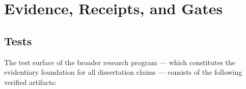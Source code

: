 
\section{Evidence, Receipts, and Gates}
\label{sec:phd-thesis-evidence}

\subsection{Tests}
\label{sec:phd-thesis-evidence-tests}

The test surface of the broader research program --- which constitutes the evidentiary
foundation for all dissertation claims --- consists of the following verified artifacts:

